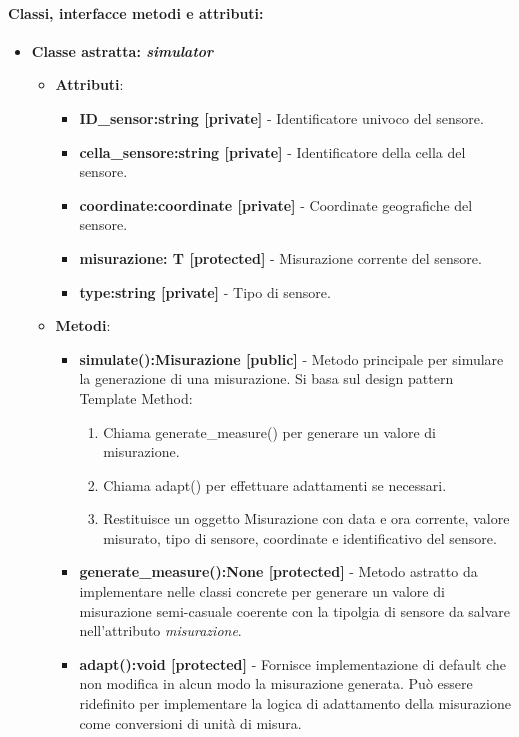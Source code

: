 \paragraph{Classi, interfacce metodi e attributi:}
\begin{itemize}
    \item {\textbf{Classe astratta: \textit{simulator}}}
        \begin{itemize}
            \item \textbf{Attributi}: 
            \begin{itemize}
                \item \textbf{ID\_sensor:string [private]} - Identificatore univoco del sensore.
                \item \textbf{cella\_sensore:string [private]} - Identificatore della cella del sensore.
                \item \textbf{coordinate:coordinate [private]} - Coordinate geografiche del sensore.
                \item \textbf{misurazione: T [protected]} - Misurazione corrente del sensore.
                \item \textbf{type:string [private]} - Tipo di sensore.
            \end{itemize}
            \item \textbf{Metodi}:
            \begin{itemize}
                \item \textbf{simulate():Misurazione [public]} - Metodo principale per simulare la generazione di una misurazione.
                Si basa sul design pattern Template Method:
                \begin{enumerate}
                    \item Chiama generate\_measure() per generare un valore di misurazione.
                    \item Chiama adapt() per effettuare adattamenti se necessari.
                    \item Restituisce un oggetto Misurazione con data e ora corrente, valore misurato, tipo di sensore, coordinate e identificativo del sensore.
                \end{enumerate}
                \item \textbf{generate\_measure():None [protected]} - Metodo astratto da implementare nelle classi concrete per generare un valore di misurazione semi-casuale coerente con la tipolgia di sensore da salvare nell'attributo \textit{misurazione}.
                \item \textbf{adapt():void [protected]} - Fornisce implementazione di default che non modifica in alcun modo la misurazione generata. Può essere ridefinito per implementare la logica di adattamento della misurazione come conversioni di unità di misura.

\end{itemize}
\end{itemize}
\end{itemize}
